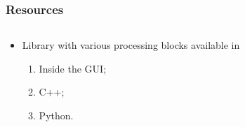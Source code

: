\begin{frame}
	\frametitle{Resources}
    
\begin{columns}
        \begin{column}{0.5\textwidth}
     \begin{itemize}
    \item Library with various processing blocks available in
    \begin{enumerate}
     \item Inside the GUI;
     \item C++;
     \item Python.
    \end{enumerate}
     \end{itemize}
     
        \end{column}
        

\end{columns}
\end{frame}
